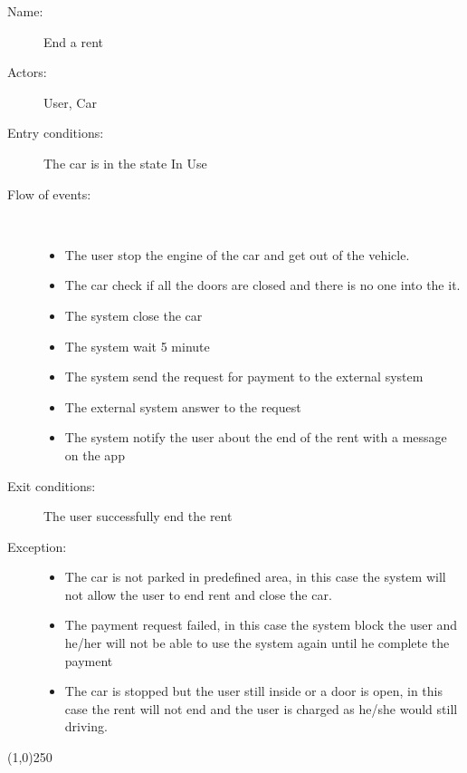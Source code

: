 \begin{description}
	\item[Name:] End a rent
	\item[Actors:] User, Car 
	\item[Entry conditions:] The car is in the state In Use
	\item[Flow of events:]  \ \\
		\begin{itemize}
			\item The user stop the engine of the car and get out of the vehicle.
			\item The car check if all the doors are closed and there is no one into the it.
			\item The system close the car
			\item The system wait 5 minute
			\item The system send the request for payment to the external system
			\item The external system answer to the request
			\item The system notify the user about the end of the rent with a message on the app
		\end{itemize}
	\item[Exit conditions:] The user successfully end the rent
	\item [Exception:] 
		\begin{itemize}
			\item The car is not parked in predefined area, in this case the system will not allow the user to end rent and close the car. 
			\item The payment request failed, in this case the system block the user and he/her will not be able to use the system  again until he complete the payment
			\item The car is stopped but the user still inside or a door is open, in this case the rent will not end and the user is charged as he/she would still driving.
		\end{itemize}
\end{description}

\begin{center}
\line(1,0){250}
\end{center}

